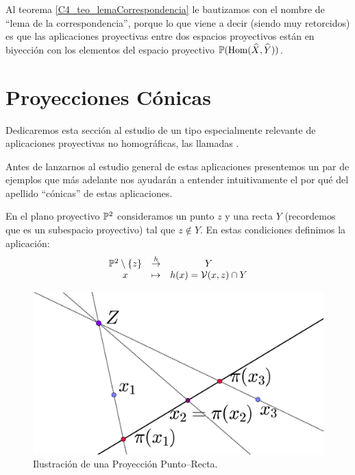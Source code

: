 Al teorema \ref{C4_teo_lemaCorrespondencia} le bautizamos con el nombre de ``lema de la correspondencia'', porque lo que viene a decir (siendo muy retorcidos) es que las aplicaciones proyectivas entre dos espacios proyectivos están en biyección con los elementos del espacio proyectivo $\mathbb{P}(\mathrm{Hom}(\widehat{X},\widehat{Y}))$.

\section{Proyecciones Cónicas}
Dedicaremos esta sección al estudio de un tipo especialmente relevante de aplicaciones proyectivas no homográficas, las llamadas .

Antes de lanzarnos al estudio general de estas aplicaciones presentemos un par de ejemplos que más adelante nos ayudarán a entender intuitivamente el por qué del apellido ``cónicas'' de estas aplicaciones.

\begin{exa}
	\label{C4_exa_puntoRecta}
	En el plano proyectivo $\mathbb{P}^2$ consideramos un punto $z$ y una recta $Y$ (recordemos que es un subespacio proyectivo) tal que $z\not\in Y$. En estas condiciones definimos la aplicación:
	\[\begin{array}{ccc}
		\mathbb{P}^2\setminus\{z\}&\stackrel{h}{\to}& Y\\
		x&\mapsto& h(x)=\mathcal{V}(x,z)\cap Y
	\end{array}\]
	\begin{figure}[h]
		\centering
		\includegraphics[scale=.15]{Graficos/rectaPunto.eps}
		\caption{Ilustración de una Proyección Punto--Recta.}
		\label{C4_puntoRecta}
	\end{figure}
	
\end{exa}

